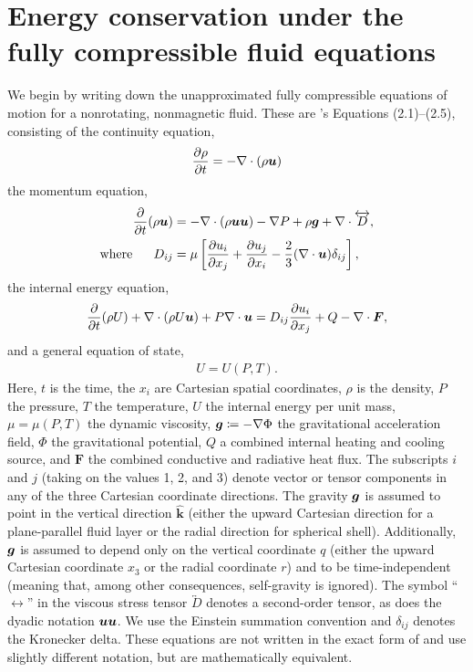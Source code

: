 \documentclass[12pt]{article}
\newcommand{\vecf}{\bm{F}}
\newcommand{\veck}{\hat{\bm{k}}}
\begin{document}
	\section{Energy conservation under the fully compressible fluid equations}\label{sec:fullycompressible}
	We begin by writing down the unapproximated fully compressible equations of motion for a nonrotating, nonmagnetic fluid. These are \citet{Gough1969}'s Equations (2.1)--(2.5), consisting of the continuity equation,
	\begin{align}\label{eq:cont}
		\frac{\partial\rho}{\partial t}=-\nabla\cdot(\rho\bm{u}) 
	\end{align}
	the momentum equation,
	\begin{subequations}\label{eq:mom}
	\begin{align}
		\frac{\partial}{\partial t}(\rho\bm{u})&=-\nabla\cdot(\rho\bm{u}\bm{u}) - \nabla P +\rho\bm{g} +\nabla\cdot \overleftrightarrow{D},\label{eq:mommain}\\
		\text{where}\ \ \ \ \  D_{ij}& = \mu\left[\frac{\partial u_i}{\partial x_j} + \frac{\partial u_j}{\partial x_i} - \frac{2}{3}(\nabla\cdot\bm{u})\delta_{ij}\right],\label{eq:momvisc}
	\end{align}
	\end{subequations}
	the internal energy equation,
	\begin{align}\label{eq:en}
		\pderiv{}{t}(\rho U) + \Div(\rho U\vecu) + P\Div\vecu = D_{ij}\pderiv{u_i}{x_j} + Q - \Div\vecf,
	\end{align}
	and a general equation of state,
	\begin{align}\label{eq:eos}
		U = U(P,T).
	\end{align}
	Here, $t$ is the time, the $x_i$ are Cartesian spatial coordinates, $\rho$ is the density, $P$ the pressure, $T$ the temperature, $U$ the internal energy per unit mass, $\mu=\mu(P,T)$ the dynamic viscosity, $\bm{g}\coloneqq -\nabla\Phi$ the gravitational acceleration field, $\Phi$ the gravitational potential, $Q$ a combined internal heating and cooling source, and $\vecf$ the combined conductive and radiative heat flux. The subscripts $i$ and $j$ (taking on the values 1, 2, and 3) denote vector or tensor components in any of the three Cartesian coordinate directions. The gravity $\bm{g}$ is assumed to point in the vertical direction $\veck$ (either the upward Cartesian direction for a plane-parallel fluid layer or the radial direction for spherical shell). Additionally, $\bm{g}$ is assumed to depend only on the vertical coordinate $q$ (either the upward Cartesian coordinate $x_3$ or the radial coordinate $r$) and to be time-independent (meaning that, among other consequences, self-gravity is ignored). The symbol ``$\leftrightarrow$'' in the viscous stress tensor $\overleftrightarrow{D}$ denotes a second-order tensor, as does the dyadic notation $\bm{u}\bm{u}$.   We use the Einstein summation convention and $\delta_{ij}$ denotes the Kronecker delta. These equations are not written in the exact form of \citet{Gough1969} and use slightly different notation, but are mathematically equivalent. 
	
\end{document}
